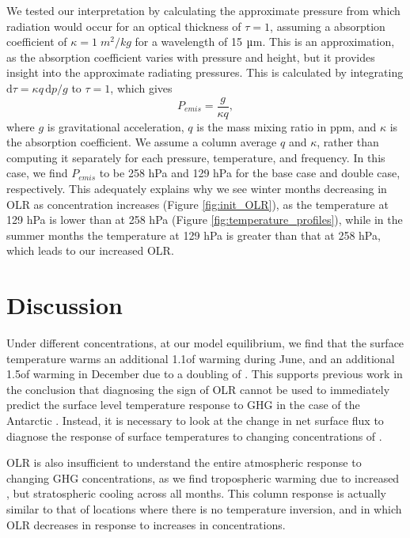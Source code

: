 \documentclass[12]{article}
\begin{document}
We tested our interpretation by calculating the approximate pressure from which radiation would occur for an optical thickness of $\tau = 1$, assuming a  absorption coefficient of $\kappa = 1\; m^2/kg$ for a wavelength of 15 $\micro$m. This is an approximation, as the absorption coefficient varies with pressure and height, but it provides insight into the approximate radiating pressures. This is calculated by integrating $\text{d}\tau = \kappa q\,\text{d}p / g$ to $\tau = 1$, which gives
\begin{equation}
    P_{emis} = \frac{g}{\kappa q},
\end{equation}
where $g$ is gravitational acceleration, $q$ is the mass mixing ratio in ppm, and $\kappa$ is the absorption coefficient. We assume a column average $q$ and $\kappa$, rather than computing it separately for each pressure, temperature, and frequency. In this case, we find $P_{emis}$ to be 258 hPa and 129 hPa for the base case and double  case, respectively. This adequately explains why we see winter months decreasing in OLR as  concentration increases (Figure \ref{fig:init_OLR}), as the temperature at 129 hPa is lower than at 258 hPa (Figure \ref{fig:temperature_profiles}), while in the summer months the temperature at 129 hPa is greater than that at 258 hPa, which leads to our increased OLR.

\section{Discussion}
Under different  concentrations, at our model equilibrium, we find that the surface temperature warms an additional 1.1\degree  of warming during June, and an additional 1.5\degree  of warming in December due to a doubling of . This supports previous work in the conclusion that diagnosing the sign of OLR cannot be used to immediately predict the surface level temperature response to GHG in the case of the Antarctic \citep{flanner_climate_2018}. Instead, it is necessary to look at the change in net surface flux to diagnose the response of surface temperatures to changing concentrations of . 

OLR is also insufficient to understand the entire atmospheric response to changing GHG concentrations, as we find tropospheric warming due to increased , but stratospheric cooling across all months. This column response is actually similar to that of locations where there is no temperature inversion, and in which OLR decreases in response to increases in  concentrations.
\end{document}
